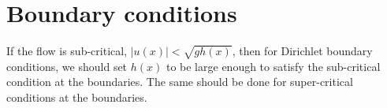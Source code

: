 
\section{Boundary conditions} %
\label{sec:boundary_conditions}
If the flow is sub-critical, $|u(x)|<\sqrt{gh(x)}$, then for Dirichlet boundary conditions, we should set $h(x)$ to be large enough to satisfy the sub-critical condition at the boundaries.  The same should be done for super-critical conditions at the boundaries.
